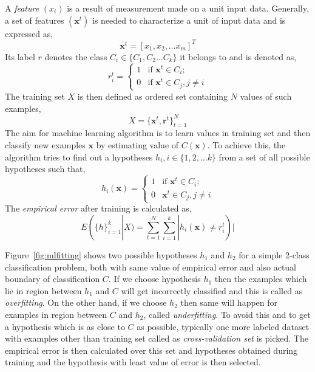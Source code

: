 A \emph{feature} $(x_i)$ is a result of measurement made on a unit input data. Generally, a set of features $(\boldsymbol{x}^t)$ is needed to characterize a unit of input data and is expressed as,
\[ \boldsymbol{x}^t = \left[ x_1, x_2, \ldots x_m \right]^T \]  
Its label $r$ denotes the class $C_i \in \{C_1, C_2 \ldots C_k\}$ it belongs to and is denoted as,
\[ r_i^t = \left\{ \begin{array}{ll}
         1 & \mbox{if $\boldsymbol{x}^t \in C_i$};\\
         0 & \mbox{if $\boldsymbol{x}^t \in C_j, j \neq i$}\end{array} \right. \] 
The training set $X$ is then defined as ordered set containing $N$ values of such examples,
\[ X = \{\boldsymbol{x}^t , \boldsymbol{r}^t \}_{t=1}^N  \]
The aim for machine learning algorithm is to learn values in training set and then classify new examples $\boldsymbol{x}$ by estimating value of $C(\boldsymbol{x})$. To achieve this, the algorithm tries to find out a hypotheses $h_i, i \in\{1,2, \ldots k\}$ from a set of all possible hypotheses such that,
\[ h_i(\boldsymbol{x}) = \left\{ \begin{array}{ll}
         1 & \mbox{if $\boldsymbol{x}^t \in C_i$};\\
         0 & \mbox{$\boldsymbol{x}^t \in C_j, j \neq i$}\end{array} \right. \] 
The \emph{empirical error} after training is calculated as,
\[ E(\{h\}_{i=1}^k|X) = \sum\limits_{t=1}^N \sum\limits_{i=1}^k | h_i(\boldsymbol{x}) \neq r_i^t ) | \]

Figure~\ref{fig:mlfitting} shows two possible hypotheses $h_1$ and $h_2$ for a simple 2-class classification problem, both with same value of empirical error and also actual boundary of classification $C$. If we choose hypothesis $h_1$ then the examples which lie in region between $h_1$ and $C$ will get incorrectly classified and this is called as \emph{overfitting}. On the other hand, if we choose $h_2$ then same will happen for examples in region between $C$ and $h_2$, called \emph{underfitting}. To avoid this and to get a hypothesis which is as close to $C$ as possible, typically one more labeled dataset with examples other than training set called as \emph{cross-validation set} is picked. The empirical error is then calculated over this set and hypotheses obtained during training and the hypothesis with least value of error is then selected. 

